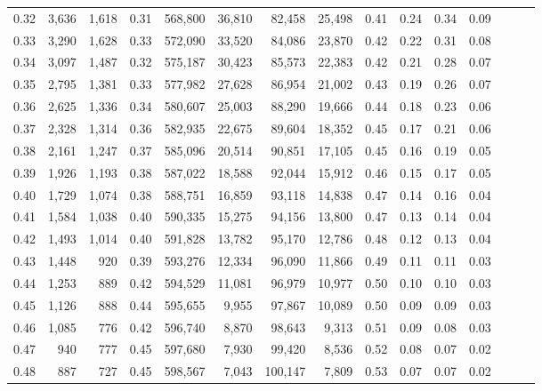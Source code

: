 \begin{tabular}{rrrrrrrrrrrrrrr}
0.32 &   3,636 &  1,618 &  0.31 &  568,800 &   36,810 &   82,458 &   25,498 &  0.41 &  0.24 &  0.34 &      0.09 \\
0.33 &   3,290 &  1,628 &  0.33 &  572,090 &   33,520 &   84,086 &   23,870 &  0.42 &  0.22 &  0.31 &      0.08 \\
0.34 &   3,097 &  1,487 &  0.32 &  575,187 &   30,423 &   85,573 &   22,383 &  0.42 &  0.21 &  0.28 &      0.07 \\
0.35 &   2,795 &  1,381 &  0.33 &  577,982 &   27,628 &   86,954 &   21,002 &  0.43 &  0.19 &  0.26 &      0.07 \\
0.36 &   2,625 &  1,336 &  0.34 &  580,607 &   25,003 &   88,290 &   19,666 &  0.44 &  0.18 &  0.23 &      0.06 \\
0.37 &   2,328 &  1,314 &  0.36 &  582,935 &   22,675 &   89,604 &   18,352 &  0.45 &  0.17 &  0.21 &      0.06 \\
0.38 &   2,161 &  1,247 &  0.37 &  585,096 &   20,514 &   90,851 &   17,105 &  0.45 &  0.16 &  0.19 &      0.05 \\
0.39 &   1,926 &  1,193 &  0.38 &  587,022 &   18,588 &   92,044 &   15,912 &  0.46 &  0.15 &  0.17 &      0.05 \\
0.40 &   1,729 &  1,074 &  0.38 &  588,751 &   16,859 &   93,118 &   14,838 &  0.47 &  0.14 &  0.16 &      0.04 \\
0.41 &   1,584 &  1,038 &  0.40 &  590,335 &   15,275 &   94,156 &   13,800 &  0.47 &  0.13 &  0.14 &      0.04 \\
0.42 &   1,493 &  1,014 &  0.40 &  591,828 &   13,782 &   95,170 &   12,786 &  0.48 &  0.12 &  0.13 &      0.04 \\
0.43 &   1,448 &    920 &  0.39 &  593,276 &   12,334 &   96,090 &   11,866 &  0.49 &  0.11 &  0.11 &      0.03 \\
0.44 &   1,253 &    889 &  0.42 &  594,529 &   11,081 &   96,979 &   10,977 &  0.50 &  0.10 &  0.10 &      0.03 \\
0.45 &   1,126 &    888 &  0.44 &  595,655 &    9,955 &   97,867 &   10,089 &  0.50 &  0.09 &  0.09 &      0.03 \\
0.46 &   1,085 &    776 &  0.42 &  596,740 &    8,870 &   98,643 &    9,313 &  0.51 &  0.09 &  0.08 &      0.03 \\
0.47 &     940 &    777 &  0.45 &  597,680 &    7,930 &   99,420 &    8,536 &  0.52 &  0.08 &  0.07 &      0.02 \\
0.48 &     887 &    727 &  0.45 &  598,567 &    7,043 &  100,147 &    7,809 &  0.53 &  0.07 &  0.07 &      0.02 \\

\end{tabular}
